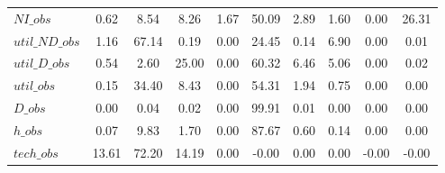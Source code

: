 \begin{center}
\begin{longtable}{lccccccccc}
$NI\_obs        $	 & 	         0.62	 & 	         8.54	 & 	         8.26	 & 	         1.67	 & 	        50.09	 & 	         2.89	 & 	         1.60	 & 	         0.00	 & 	        26.31 \\ 
$util\_ND\_obs  $	 & 	         1.16	 & 	        67.14	 & 	         0.19	 & 	         0.00	 & 	        24.45	 & 	         0.14	 & 	         6.90	 & 	         0.00	 & 	         0.01 \\ 
$util\_D\_obs   $	 & 	         0.54	 & 	         2.60	 & 	        25.00	 & 	         0.00	 & 	        60.32	 & 	         6.46	 & 	         5.06	 & 	         0.00	 & 	         0.02 \\ 
$util\_obs      $	 & 	         0.15	 & 	        34.40	 & 	         8.43	 & 	         0.00	 & 	        54.31	 & 	         1.94	 & 	         0.75	 & 	         0.00	 & 	         0.00 \\ 
$D\_obs         $	 & 	         0.00	 & 	         0.04	 & 	         0.02	 & 	         0.00	 & 	        99.91	 & 	         0.01	 & 	         0.00	 & 	         0.00	 & 	         0.00 \\ 
$h\_obs         $	 & 	         0.07	 & 	         9.83	 & 	         1.70	 & 	         0.00	 & 	        87.67	 & 	         0.60	 & 	         0.14	 & 	         0.00	 & 	         0.00 \\ 
$tech\_obs      $	 & 	        13.61	 & 	        72.20	 & 	        14.19	 & 	         0.00	 & 	        -0.00	 & 	         0.00	 & 	         0.00	 & 	        -0.00	 & 	        -0.00 \\ 
\end{longtable}
 \end{center}
